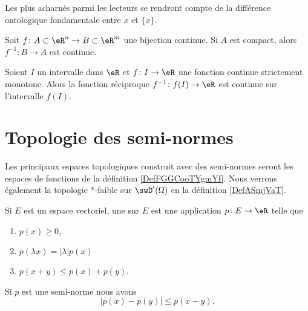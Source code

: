 Les plus acharnés parmi les lecteurs se rendront compte de la différence ontologique fondamentale entre \( x\) et \( \{ x \}\).

\begin{proposition}	\label{PropoInvCompCont}
Soit $f\colon A\subset\eR^n\to B\subset\eR^m$ une bijection continue. Si $A$ est compact, alors $f^{-1}\colon B\to A$ est continue.
\end{proposition}

\begin{proposition}		\label{PropIntContMOnIvCont}
Soient $I$ un intervalle dans $\eR$ et $f\colon I\to \eR$ une fonction continue strictement monotone. Alors la fonction réciproque $f^{-1}\colon f(I)\to \eR$ est continue sur l'intervalle $f(I)$.
\end{proposition}

\section{Topologie des semi-normes}

Les principaux espaces topologiques construit avec des semi-normes seront les espaces de fonctions de la définition \ref{DefFGGCooTYgmYf}. Nous verrons également la topologie \( *\)-faible sur \( \swD'(\Omega)\) en la définition \ref{DefASmjVaT}.

\begin{definition}  \label{DefPNXlwmi}
    Si \( E\) est un espace vectoriel, une  sur \( E\) est une application \( p\colon E\to \eR\) telle que
    \begin{enumerate}
        \item
            \( p(x)\geq 0\),
        \item   \label{ItemSHnimhDii}
            \( p(\lambda x)=| \lambda |p(x)\)
        \item   \label{ItemSHnimhDiii}
            \( p(x+y)\leq p(x)+p(y)\).
    \end{enumerate}
\end{definition}

\begin{lemma}
    Si \( p\) est une semi-norme nous avons
    \begin{equation}
        | p(x)-p(y) |\leq p(x-y).
    \end{equation}
\end{lemma}

